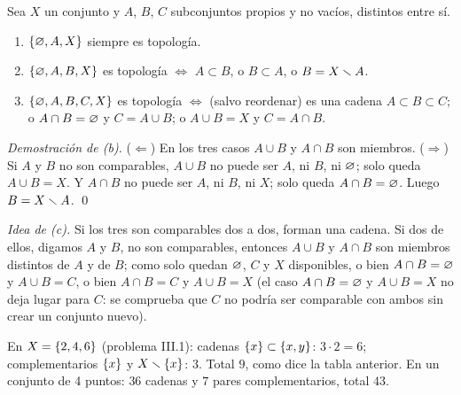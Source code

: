 \begin{teorema}
Sea $X$ un conjunto y $A$, $B$, $C$ subconjuntos propios y no vacíos, distintos entre sí.
\begin{enumerate}[label=(\alph*),leftmargin=1.9em]
\item $\{\varnothing,A,X\}$ siempre es topología.
\item $\{\varnothing,A,B,X\}$ es topología $\iff$ $A\subset B$, o $B\subset A$, o $B=X\smallsetminus A$.
\item $\{\varnothing,A,B,C,X\}$ es topología $\iff$ (salvo reordenar) es una cadena $A\subset B\subset C$; o
$A\cap B=\varnothing$ y $C=A\cup B$; o $A\cup B=X$ y $C=A\cap B$.
\end{enumerate}
\end{teorema}
\emph{Demostración de (b).} ($\Leftarrow$) En los tres casos $A\cup B$ y $A\cap B$ son miembros. ($\Rightarrow$) Si $A$
y $B$ no son comparables, $A\cup B$ no puede ser $A$, ni $B$, ni $\varnothing$; solo queda $A\cup B=X$. Y $A\cap B$ no puede
ser $A$, ni $B$, ni $X$; solo queda $A\cap B=\varnothing$. Luego $B=X\smallsetminus A$. \qed

\emph{Idea de (c).} Si los tres son comparables dos a dos, forman una cadena. Si dos de ellos, digamos $A$ y $B$, no
son comparables, entonces $A\cup B$ y $A\cap B$ son miembros distintos de $A$ y de $B$; como solo quedan $\varnothing$, $C$ y
$X$ disponibles, o bien $A\cap B=\varnothing$ y $A\cup B=C$, o bien $A\cap B=C$ y $A\cup B=X$ (el caso $A\cap B=\varnothing$ y
$A\cup B=X$ no deja lugar para $C$: se comprueba que $C$ no podría ser comparable con ambos sin crear un conjunto
nuevo).

\begin{ejemplo}
En $X=\{2,4,6\}$ (problema III.1): cadenas $\{x\}\subset\{x,y\}$: $3\cdot2=6$; complementarios $\{x\}$ y
$X\smallsetminus\{x\}$: $3$. Total $9$, como dice la tabla anterior. En un conjunto de 4 puntos: $36$ cadenas y $7$ pares
complementarios, total $43$.
\end{ejemplo}

